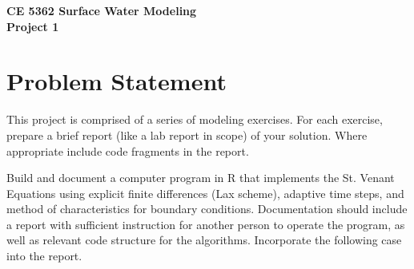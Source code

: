 \documentclass[12pt]{article}
\begin{document}
\begin{center}
{\textbf{{ CE 5362 Surface Water Modeling} \\ {Project 1}}}
\end{center}

\section*{{Problem Statement}}
This project is comprised of a series of modeling exercises.
For each exercise, prepare a brief report (like a lab report in scope) of your solution.  
Where appropriate include code fragments in the report.

Build and document a computer program in R that implements the St. Venant Equations using explicit finite differences (Lax scheme), adaptive time steps, and method of characteristics for boundary conditions. Documentation should include a report with sufficient instruction for another person to operate the program, as well as relevant code structure for the algorithms. Incorporate the following case into the report.
\end{document}
